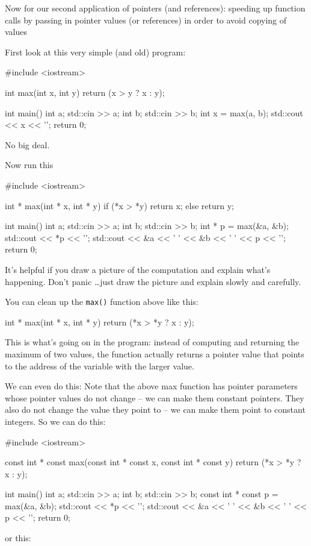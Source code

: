 \newpage{}

Now for our second application of pointers (and references): speeding up function calls by passing in pointer values (or references) in order to avoid copying of values

First look at this very simple (and old) program:

\begin{consolethree}[escapeinside=||]
#include <iostream>

int max(int x, int y)
{
    return (x > y ? x : y);
}

int main()
{
    int a;
    std::cin >> a;
    int b;
    std::cin >> b;
    int x = max(a, b);
    std::cout << x << '\n';
    return 0;
}
\end{consolethree}
No big deal.

Now run this

\begin{consolethree}[escapeinside=||]
#include <iostream>

int * max(int * x, int * y)
{
    if (*x > *y)
    {
        return x;
    }
    else
    {
        return y;
    }
}

int main()
{
    int a;
    std::cin >> a;
    int b;
    std::cin >> b;
    int * p = max(&a, &b);
    std::cout << *p << '\n';
    std::cout << &a << ' ' << &b
              << ' ' << p << '\n';
    return 0;
}
\end{consolethree}
It's helpful if you draw a picture of the computation and explain what's happening. Don't panic \ldots just draw the picture and explain slowly and carefully.

You can clean up the \texttt{max()} function above like this:

\begin{consolethree}[escapeinside=||]
int * max(int * x, int * y)
{
    return (*x > *y ? x : y);
}
\end{consolethree}
This is what's going on in the program: instead of computing and returning the maximum of two values, the function actually returns a pointer value that points to the address of the variable with the larger value.

We can even do this: Note that the above max function has pointer parameters whose pointer values do not change -- we can make them constant pointers. They also do not change the value they point to -- we can make them point to constant integers. So we can do this:

\begin{consolethree}[escapeinside=||]
#include <iostream>

const int * const max(const int * const x,
                      const int * const y)
{
    return (*x > *y ? x : y);
}

int main()
{
    int a;
    std::cin >> a;
    int b;
    std::cin >> b;
    const int * const p = max(&a, &b);
    std::cout << *p << '\n';
    std::cout << &a << ' ' << &b << ' '
              << p << '\n';
    return 0;
}
\end{consolethree}
or this:

